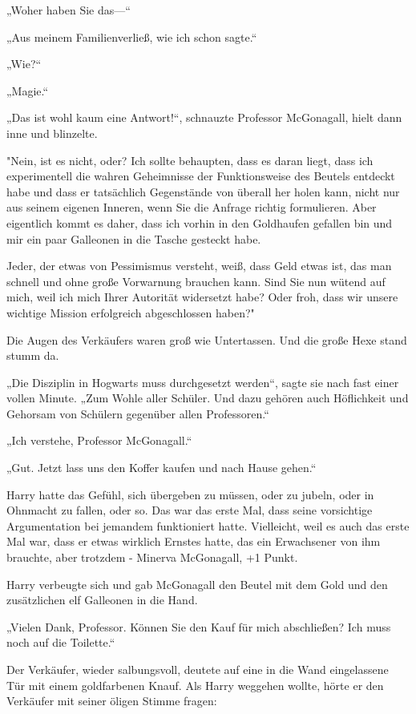 {„Woher haben Sie das—“

„Aus meinem Familienverließ, wie ich schon sagte.“

„Wie?“

„Magie.“

„Das ist wohl kaum eine Antwort!“, schnauzte Professor McGonagall, hielt dann inne und blinzelte.

"Nein, ist es nicht, oder? Ich sollte behaupten, dass es daran liegt, dass ich experimentell die wahren Geheimnisse der Funktionsweise des Beutels entdeckt habe und dass er tatsächlich Gegenstände von überall her holen kann, nicht nur aus seinem eigenen Inneren, wenn Sie die Anfrage richtig formulieren. Aber eigentlich kommt es daher, dass ich vorhin in den Goldhaufen gefallen bin und mir ein paar Galleonen in die Tasche gesteckt habe.

Jeder, der etwas von Pessimismus versteht, weiß, dass Geld etwas ist, das man schnell und ohne große Vorwarnung brauchen kann. Sind Sie nun wütend auf mich, weil ich mich Ihrer Autorität widersetzt habe? Oder froh, dass wir unsere wichtige Mission erfolgreich abgeschlossen haben?"

Die Augen des Verkäufers waren groß wie Untertassen. Und die große Hexe stand stumm da.

„Die Disziplin in Hogwarts muss durchgesetzt werden“, sagte sie nach fast einer vollen Minute. „Zum Wohle aller Schüler. Und dazu gehören auch Höflichkeit und Gehorsam von Schülern gegenüber allen Professoren.“

„Ich verstehe, Professor McGonagall.“

„Gut. Jetzt lass uns den Koffer kaufen und nach Hause gehen.“

Harry hatte das Gefühl, sich übergeben zu müssen, oder zu jubeln, oder in Ohnmacht zu fallen, oder so. Das war das erste Mal, dass seine vorsichtige Argumentation bei jemandem funktioniert hatte. Vielleicht, weil es auch das erste Mal war, dass er etwas wirklich Ernstes hatte, das ein Erwachsener von ihm brauchte, aber trotzdem - Minerva McGonagall, +1 Punkt.

Harry verbeugte sich und gab McGonagall den Beutel mit dem Gold und den zusätzlichen elf Galleonen in die Hand.

„Vielen Dank, Professor. Können Sie den Kauf für mich abschließen? Ich muss noch auf die Toilette.“

Der Verkäufer, wieder salbungsvoll, deutete auf eine in die Wand eingelassene Tür mit einem goldfarbenen Knauf. Als Harry weggehen wollte, hörte er den Verkäufer mit seiner öligen Stimme fragen:

}

